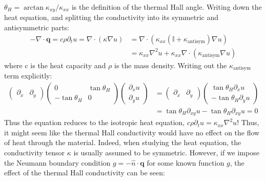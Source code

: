 \documentclass{thesis-umich}
\begin{document}
\(\theta_H = \arctan \kappa_{xy}/\kappa_{xx}\) is the definition of the thermal
Hall angle. Writing down the heat equation, and splitting the conductivity into
its symmetric and antisymmetric parts: \begin{align*} -\nabla \cdot \mathbf{q}
	= c \rho \partial_t u = \nabla \cdot (\kappa \nabla u) &= \nabla \cdot
	(\kappa_{xx}(\mathbb{I} + \kappa_{\mathrm{antisym}}) \nabla u) \\ &=
	\kappa_{xx}\nabla^2 u + \kappa_{xx}\nabla \cdot
	(\kappa_{\mathrm{antisym}} \nabla u) \end{align*} where c is the heat
capacity and \(\rho\) is the mass density. Writing out the
\(\kappa_\mathrm{antisym}\) term explicitly:
\begin{align*}\begin{pmatrix} \partial_x & \partial_y \end{pmatrix} \begin{pmatrix} 0 & \tan
\theta_H \\ -\tan \theta_H & 0 \end{pmatrix} \begin{pmatrix} \partial_x u \\
\partial_y u \end{pmatrix} &= \begin{pmatrix} \partial_x & \partial_y
\end{pmatrix} \begin{pmatrix} \tan \theta_H \partial_x u \\ -\tan \theta_H
\partial_y u \end{pmatrix} \\ &= \tan \theta_H \partial_{xy} u - \tan \theta_H
\partial_{xy} u = 0\end{align*} Thus the equation reduces to the
isotropic heat equation,
\(c\rho \partial_t u = \kappa_{xx} \nabla^2 u\)! Thus, it might seem
like the thermal Hall conductivity would have no effect on the flow of
heat through the material. Indeed, when studying the heat equation, the
conductivity tensor \(\kappa\) is usually assumed to be symmetric.
However, if we impose the Neumann boundary condition
\(g = -\hat{n} \cdot \mathbf{q}\) for some known function \(g\), the
effect of the thermal Hall conductivity can be seen:
\end{document}
